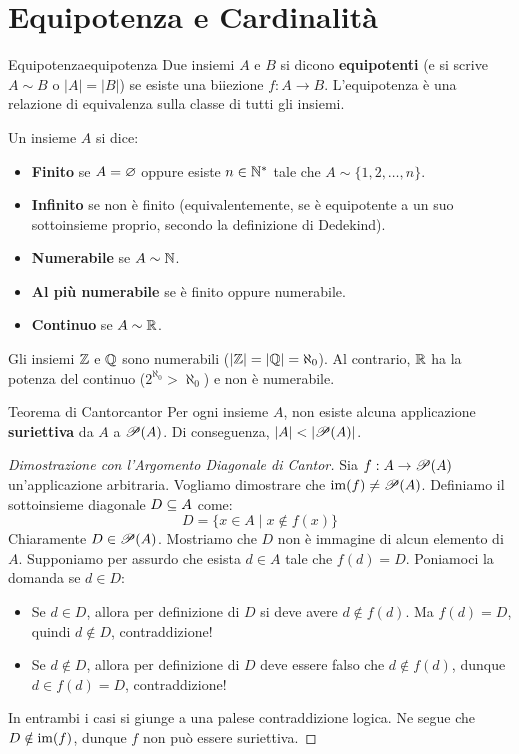 \section{Equipotenza e Cardinalità}

\begin{definizione}{Equipotenza}{equipotenza}
Due insiemi $A$ e $B$ si dicono \textbf{equipotenti} (e si scrive $A \sim B$ o $|A| = |B|$) se esiste una biiezione $f: A \to B$.
L'equipotenza è una relazione di equivalenza sulla classe di tutti gli insiemi.
\end{definizione}

Un insieme $A$ si dice:
\begin{itemize}
    \item \textbf{Finito} se $A = \vuoto$ oppure esiste $n \in \N^*$ tale che $A \sim \{1, 2, \dots, n\}$.
    \item \textbf{Infinito} se non è finito (equivalentemente, se è equipotente a un suo sottoinsieme proprio, secondo la definizione di Dedekind).
    \item \textbf{Numerabile} se $A \sim \N$.
    \item \textbf{Al più numerabile} se è finito oppure numerabile.
    \item \textbf{Continuo} se $A \sim \R$.
\end{itemize}

Gli insiemi $\Z$ e $\Q$ sono numerabili ($|\Z| = |\Q| = \aleph_0$). Al contrario, $\R$ ha la potenza del continuo ($2^{\aleph_0} > \aleph_0$) e non è numerabile.

\begin{teorema}{Teorema di Cantor}{cantor}
Per ogni insieme $A$, non esiste alcuna applicazione \textbf{suriettiva} da $A$ a $\P(A)$. Di conseguenza, $|A| < |\P(A)|$.
\end{teorema}

\begin{proof}[Dimostrazione con l'Argomento Diagonale di Cantor]
Sia $f: A \to \P(A)$ un'applicazione arbitraria. Vogliamo dimostrare che $\im(f) \neq \P(A)$.
Definiamo il sottoinsieme diagonale $D \sseq A$ come:
\[
    D = \{x \in A \mid x \notin f(x)\}
\]
Chiaramente $D \in \P(A)$. Mostriamo che $D$ non è immagine di alcun elemento di $A$.
Supponiamo per assurdo che esista $d \in A$ tale che $f(d) = D$.
Poniamoci la domanda se $d \in D$:
\begin{itemize}
    \item Se $d \in D$, allora per definizione di $D$ si deve avere $d \notin f(d)$. Ma $f(d) = D$, quindi $d \notin D$, contraddizione!
    \item Se $d \notin D$, allora per definizione di $D$ deve essere falso che $d \notin f(d)$, dunque $d \in f(d) = D$, contraddizione!
\end{itemize}
In entrambi i casi si giunge a una palese contraddizione logica. Ne segue che $D \notin \im(f)$, dunque $f$ non può essere suriettiva.
\end{proof}
